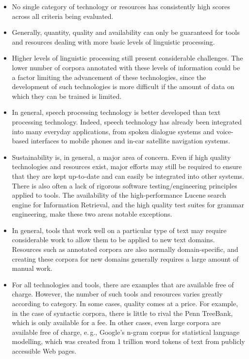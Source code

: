 \begin{multicols}{2}
\begin{itemize}
\item No single category of technology or resources has consistently high scores across all criteria being evaluated.         
\item Generally, quantity, quality and availability can only be guaranteed for tools and resources dealing with more basic levels of linguistic processing.    
\item Higher levels of linguistic processing still present considerable challenges. The lower number of corpora annotated with these levels of information could be a factor limiting the advancement of these technologies, since the development of such technologies is more difficult if the amount of data on which they can be trained is limited.
\item In general, speech processing technology is better developed than text processing technology. Indeed, speech technology has already been integrated into many everyday applications, from spoken dialogue systems and voice-based interfaces to mobile phones and in-car satellite navigation systems.
\item Sustainability is, in general, a major area of concern. Even if high quality technologies and resources exist, major efforts may still be required to ensure that they are kept up-to-date and can easily be integrated into other systems. There is also often a lack of rigorous software testing/engineering principles applied to tools. The availability of the high-performance Lucene search engine for Information Retrieval, and the high quality test suites for grammar engineering, make these two areas notable exceptions.  
\item In general, tools that work well on a particular type of text may require considerable work to allow them to be applied to new text domains. Resources such as annotated corpora are also normally domain-specific, and creating these corpora for new domains generally requires a large amount of manual work.
\item For all technologies and tools, there are examples that are available free of charge. However, the number of such tools and resources varies greatly according to category.  In some cases, quality comes at a price. For example, in the case of syntactic corpora, there is little to rival the Penn TreeBank, which is only available for a fee. In other cases, even large corpora are available free of charge, e.\,g., Google's n-gram corpus for statistical language modelling, which was created from 1 trillion word tokens of text from publicly accessible Web pages.       

\end{itemize}
\end{multicols}
